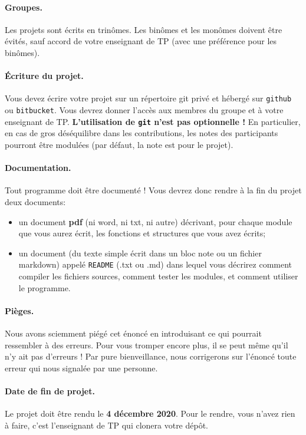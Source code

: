 \documentclass[a4paper]{article}
\begin{document}
\paragraph{Groupes.} Les projets sont écrits en trinômes. Les binômes
et les monômes doivent être évités, sauf accord de votre enseignant de
TP (avec une préférence pour les binômes).

\paragraph{Écriture du projet.} Vous devez écrire votre projet sur un
répertoire git privé et hébergé sur \texttt{github} ou
\texttt{bitbucket}. Vous devrez donner l'accès aux membres du groupe
et à votre enseignant de TP. \textbf{L'utilisation de \texttt{git}
  n'est pas optionnelle !} En particulier, en cas de gros déséquilibre
dans les contributions, les notes des participants pourront être
modulées (par défaut, la note est pour le projet).

\paragraph{Documentation.} Tout programme doit être documenté ! Vous
devrez donc rendre à la fin du projet deux documents:
\begin{itemize}
\item un document \textbf{pdf} (ni word, ni txt, ni autre) décrivant,
  pour chaque module que vous aurez écrit, les fonctions et structures
  que vous avez écrits;
\item un document (du texte simple écrit dans un bloc note ou un
  fichier markdown) appelé \texttt{README} (.txt ou .md) dans lequel
  vous décrirez comment compiler les fichiers sources, comment tester
  les modules, et comment utiliser le programme.
\end{itemize}

\paragraph{Pièges.} Nous avons sciemment piégé cet énoncé en
introduisant ce qui pourrait ressembler à des erreurs. Pour vous
tromper encore plus, il se peut même qu'il n'y ait pas d'erreurs ! Par
pure bienveillance, nous corrigerons sur l'énoncé toute erreur qui
nous signalée par une personne.

\paragraph{Date de fin de projet.} Le projet doit être rendu le
\textbf{4 décembre 2020}. Pour le rendre, vous n'avez rien à faire,
c'est l'enseignant de TP qui clonera votre dépôt.
\end{document}

